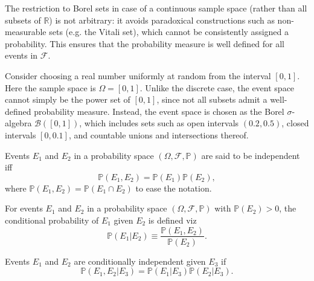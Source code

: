 \begin{remark}
	The restriction to Borel sets in case of a continuous sample space (rather than all subsets of $\mathbb{R}$) is not arbitrary: it avoids paradoxical constructions such as non-measurable sets (e.g. the Vitali set), which cannot be consistently assigned a probability. This ensures that the probability measure is well defined for all events in $\mathcal{F}$.
\end{remark}

\begin{example}
	Consider choosing a real number uniformly at random from the interval $[0,1]$. Here the sample space is $\Omega = [0,1]$. Unlike the discrete case, the event space cannot simply be the power set of $[0,1]$, since not all subsets admit a well-defined probability measure. Instead, the event space is chosen as the Borel $\sigma$-algebra $\mathcal{B}([0,1])$, which includes sets such as open intervals $(0.2, 0.5)$, closed intervals $[0, 0.1]$, and countable unions and intersections thereof.
\end{example}




\begin{definition}[Independence]
	\label{def:independence}
	Events $E_1$ and $E_2$  in a probability space $(\Omega, \mathcal{F}, \mathbb{P})$ are said to be independent iff
	\begin{equation}
		\mathbb{P}(E_1,E_2) = \mathbb{P}(E_1) \mathbb{P}(E_2),
		\label{eq:ind}
	\end{equation}
	where $\mathbb{P}(E_1,E_2)= \mathbb{P}(E_1\cap E_2)$ to ease the notation.
\end{definition}

\begin{definition}
	\label{def:conditional_probability}
	For events $E_1$ and $E_2$ in a probability space $(\Omega, \mathcal{F}, \mathbb{P})$ with $\mathbb{P}(E_2) > 0$, the conditional probability of $E_1$ given $E_2$ is defined viz
	\begin{equation}
		\mathbb{P}(E_1|E_2) \equiv \frac{\mathbb{P}(E_1, E_2)}{\mathbb{P}(E_2)}.
		\label{eq:cond}
	\end{equation}
\end{definition}

\begin{definition}
\label{def:conditional_independence}
Events $E_1$ and $E_2$ are conditionally independent given $E_3$ if
\begin{equation}
\mathbb{P}(E_1, E_2 | E_3) = \mathbb{P}(E_1|E_3)\mathbb{P}(E_2|E_3).
\end{equation}
\end{definition}

